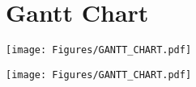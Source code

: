 
\chapter{Gantt Chart} %

\label{AppendixA} %



\begin{figure*}[!ht]
	\centering
	\texttt{[image: Figures/GANTT\_CHART.pdf]}
\end{figure*}

\begin{figure*}
	\centering
	\texttt{[image: Figures/GANTT\_CHART.pdf]}
\end{figure*}

